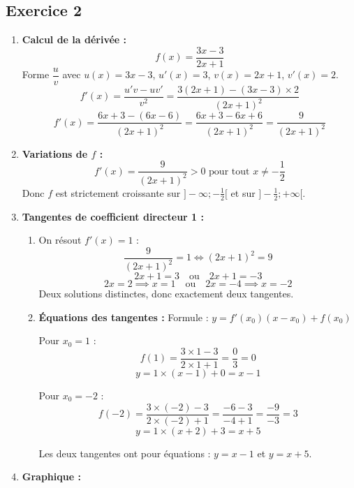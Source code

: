 \documentclass[a4paper,12pt]{article}
\begin{document}
\newpage

\subsection*{Exercice 2}

\begin{enumerate}
\item \textbf{Calcul de la dérivée :}
\[
f(x) = \frac{3x - 3}{2x + 1}
\]
Forme $\dfrac{u}{v}$ avec $u(x) = 3x - 3$, $u'(x) = 3$, $v(x) = 2x + 1$, $v'(x) = 2$.
\[
f'(x) = \frac{u'v - uv'}{v^2} = \frac{3(2x+1) - (3x-3) \times 2}{(2x+1)^2}
\]
\[
f'(x) = \frac{6x + 3 - (6x - 6)}{(2x+1)^2} = \frac{6x + 3 - 6x + 6}{(2x+1)^2} = \frac{9}{(2x+1)^2}
\]

\item \textbf{Variations de $f$ :}
\[
f'(x) = \frac{9}{(2x+1)^2} > 0 \text{ pour tout } x \neq -\frac{1}{2}
\]
Donc $f$ est strictement croissante sur $]-\infty ; -\frac{1}{2}[$ et sur $]-\frac{1}{2} ; +\infty[$.

\item \textbf{Tangentes de coefficient directeur 1 :}
\begin{enumerate}
\item On résout $f'(x) = 1$ :
\[
\frac{9}{(2x+1)^2} = 1 \iff (2x+1)^2 = 9
\]
\[
2x+1 = 3 \quad \text{ou} \quad 2x+1 = -3
\]
\[
2x = 2 \implies x = 1 \quad \text{ou} \quad 2x = -4 \implies x = -2
\]
Deux solutions distinctes, donc exactement deux tangentes.

\item \textbf{Équations des tangentes :}
Formule : $y = f'(x_0)(x - x_0) + f(x_0)$

Pour $x_0 = 1$ :
\[
f(1) = \frac{3 \times 1 - 3}{2 \times 1 + 1} = \frac{0}{3} = 0
\]
\[
y = 1 \times (x - 1) + 0 = x - 1
\]

Pour $x_0 = -2$ :
\[
f(-2) = \frac{3 \times (-2) - 3}{2 \times (-2) + 1} = \frac{-6 - 3}{-4 + 1} = \frac{-9}{-3} = 3
\]
\[
y = 1 \times (x + 2) + 3 = x + 5
\]

Les deux tangentes ont pour équations : $y = x - 1$ et $y = x + 5$.
\end{enumerate}

\item \textbf{Graphique :}

\begin{center}
\end{center}
\end{enumerate}
\end{document}
